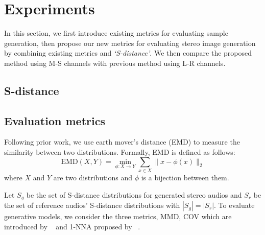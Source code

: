 \section{Experiments}
\label{sec:experiment}

In this section, we first introduce existing metrics for evaluating sample generation, then propose our new metrics for evaluating stereo image generation by combining existing metrics and \textit{`S-distance'}. We then compare the proposed method using M-S channels with previous method using L-R channels.

\subsection{S-distance}
\label{subsec:s-distance}


\subsection{Evaluation metrics}
\label{subsec:metric}
Following prior work, we use earth mover's distance (EMD) to measure the similarity between two distributions. Formally, EMD is defined as follows:
\begin{equation}
    \text{EMD}(X,Y) = \min_{\phi: X\to Y} \sum_{x\in X} \|x-\phi(x)\|_2 \nonumber
\end{equation}
where $X$ and $Y$ are two distributions and $\phi$ is a bijection between them.


Let $S_g$ be the set of S-distance distributions for generated stereo audios and $S_r$ be the set of reference audios' S-distance distributions with $|S_g| = |S_r|$. To evaluate generative models, we consider the three metrics, MMD, COV which are introduced by ~\cite{achlioptas} and 1-NNA proposed by ~\cite{1-nna}.

